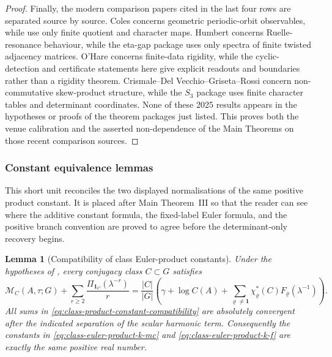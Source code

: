 \documentclass[11pt,a4paper]{amsart}
\theoremstyle{plain}
\newtheorem{lemma}[theorem]{Lemma}
\theoremstyle{definition}
\theoremstyle{remark}
\begin{document}
\begin{proof}
  Finally, the modern comparison papers cited in the last four rows are
  separated source by source.  Coles concerns geometric periodic-orbit
  observables, while 
  use only finite quotient and character maps.  Humbert concerns
  Ruelle-resonance behaviour, while the eta-gap package uses only spectra of
  finite twisted adjacency matrices.  O'Hare concerns finite-data rigidity,
  while the cyclic-detection and certificate statements here give explicit
  readouts and boundaries rather than a rigidity theorem.  Crismale--Del
  Vecchio--Griseta--Rossi concern non-commutative skew-product structure, while
  the \(S_3\) package uses finite character tables and determinant coordinates.
  None of these 2025 results appears in the hypotheses or proofs of the theorem
  packages just listed.  This proves both the venue calibration and the asserted
  non-dependence of the Main Theorems on those recent comparison sources.
\end{proof}

\subsubsection{Constant equivalence lemmas}

This short unit reconciles the two displayed normalisations of the same
positive product constant.  It is placed after Main Theorem~III so that the
reader can see where the additive constant formula, the fixed-label Euler
formula, and the positive branch convention are proved to agree before the
determinant-only recovery begins.

\begin{lemma}[Compatibility of class Euler-product constants]
  \label{lem:class-product-constant-equivalence}
  Under the hypotheses of , every
  conjugacy class \(C\subset G\) satisfies
  \begin{equation}\label{eq:class-product-constant-compatibility}
    \mathcal M_C(A,\tau;G)
    +\sum_{r\ge2}\frac{\Pi_{\mathbf1_C}(\lambda^{-r})}{r}
    =
    \frac{|C|}{|G|}
    \left(
      \gamma+\log C(A)
      +\sum_{\varrho\neq\mathbf1}
        \chi_\varrho^\ast(C)F_\varrho(\lambda^{-1})
    \right).
  \end{equation}
  All sums in \eqref{eq:class-product-constant-compatibility} are
  absolutely convergent after the indicated separation of the scalar
  harmonic term. Consequently the constants in
  \eqref{eq:class-euler-product-k-mc} and
  \eqref{eq:class-euler-product-k-f} are exactly the same positive real
  number.
\end{lemma}
\end{document}
